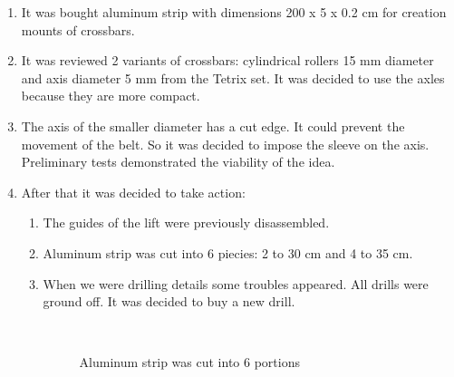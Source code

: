 \begin{enumerate}
\begin{enumerate}
      \item  It was bought aluminum strip with dimensions 200 x 5 x 0.2 cm for creation mounts of crossbars.
      
      \item It was reviewed 2 variants of crossbars: cylindrical rollers 15 mm diameter and axis diameter 5 mm from the Tetrix set. It was decided to use the axles because they are more compact.
       
      \item The axis of the smaller diameter has a cut edge. It could prevent the movement of the belt. So it was decided to impose the  sleeve on the axis. Preliminary tests demonstrated the viability of the idea.
        
      \item After that it was decided to take action:
      \begin{enumerate}
      	\item The guides of the lift were previously disassembled.
      	
      	\item  Aluminum strip was cut into 6 piecies: 2 to 30 cm and 4 to 35 cm.
      	
      	\item When we were drilling details some troubles appeared. All drills were ground off. It was decided to buy a new drill.
      	
      	\begin{figure}[H]
      		\begin{minipage}[h]{0.2\linewidth}
      			\center  
      		\end{minipage}
      		\begin{minipage}[h]{0.6\linewidth}
      			\caption{Aluminum strip was cut into 6 portions}
      		\end{minipage}
      	\end{figure}
      	

\end{enumerate}
\end{enumerate}
\end{enumerate}
